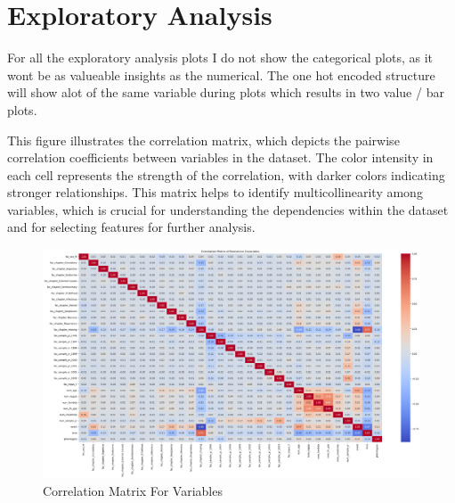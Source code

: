 \section{Exploratory Analysis}
For all the exploratory analysis plots I do not show the categorical plots, as it wont be as valueable insights as the numerical. The one hot encoded structure will show alot of the same variable during plots which results in two value / bar plots.


\noindent This figure illustrates the correlation matrix, which depicts the pairwise correlation coefficients between variables in the dataset. The color intensity in each cell represents the strength of the correlation, with darker colors indicating stronger relationships. This matrix helps to identify multicollinearity among variables, which is crucial for understanding the dependencies within the dataset and for selecting features for further analysis.
\begin{figure}[h]
    \centering
    \includegraphics[scale=0.28]{Figures/EDA/corr.png}
    \caption{Correlation Matrix For Variables}
    \label{fig:corr_matrix}
\end{figure}

\clearpage

